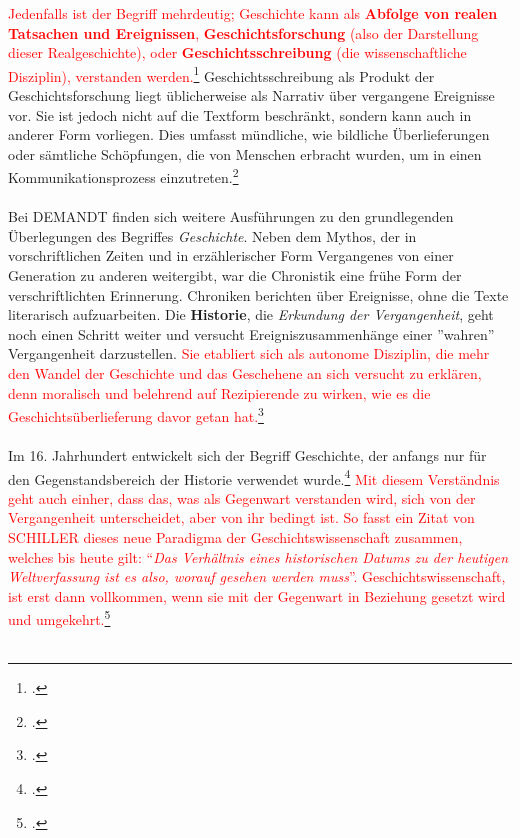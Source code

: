 \documentclass[12pt,a4paper]{article}
\begin{document}
\textcolor{red}{
Jedenfalls ist der Begriff mehrdeutig; Geschichte kann als \textbf{Abfolge von realen Tatsachen und Ereignissen}, \textbf{Geschichtsforschung} (also der Darstellung dieser Realgeschichte), oder \textbf{Geschichtsschreibung} (die wissenschaftliche Disziplin), verstanden werden.\footcite[][S.1]{Gabriel2013fakten}} Geschichtsschreibung als Produkt der Geschichtsforschung liegt üblicherweise als Narrativ über vergangene Ereignisse vor. Sie ist jedoch nicht auf die Textform beschränkt, sondern kann auch in anderer Form vorliegen. Dies umfasst mündliche, wie bildliche Überlieferungen oder sämtliche Schöpfungen, die von Menschen erbracht wurden, um in einen Kommunikationsprozess einzutreten.\footcite[][S.5-7]{frank2018visualisierungswerkzeuge}
\\
\\
Bei DEMANDT finden sich weitere Ausführungen zu den grundlegenden Überlegungen des Begriffes \textit{Geschichte}. Neben dem Mythos, der in vorschriftlichen Zeiten und in erzählerischer Form Vergangenes von einer Generation zu anderen weitergibt, war die Chronistik eine frühe Form der verschriftlichten Erinnerung. Chroniken berichten über Ereignisse, ohne die Texte literarisch aufzuarbeiten. Die \textbf{Historie}, die \textit{Erkundung der Vergangenheit}, geht noch einen Schritt weiter und versucht Ereigniszusammenhänge einer ''wahren'' Vergangenheit darzustellen. \textcolor{red}{Sie etabliert sich als autonome Disziplin, die mehr den Wandel der Geschichte und das Geschehene an sich versucht zu erklären, denn moralisch und belehrend auf Rezipierende zu wirken, wie es die Geschichtsüberlieferung davor getan hat.\footcite[][S.24]{hardtwig1990geschichtskultur}}
\\
\\
Im 16. Jahrhundert entwickelt sich der Begriff Geschichte, der anfangs nur für den Gegenstandsbereich der Historie verwendet wurde.\footcite[][S.57-58]{schulz2010neuere} \textcolor{red}{Mit diesem Verständnis geht auch einher, dass das, was als Gegenwart verstanden wird, sich von der Vergangenheit unterscheidet, aber von ihr bedingt ist. So fasst ein Zitat von SCHILLER dieses neue Paradigma der Geschichtswissenschaft zusammen, welches bis heute gilt: “\textit{Das Verhältnis eines historischen Datums zu der heutigen Weltverfassung ist es also, worauf gesehen werden muss}”. Geschichtswissenschaft, ist erst dann vollkommen, wenn sie mit der Gegenwart in Beziehung gesetzt wird und umgekehrt.\footcite[][S.25]{hardtwig1990geschichtskultur}}
\\
\\
\end{document}
